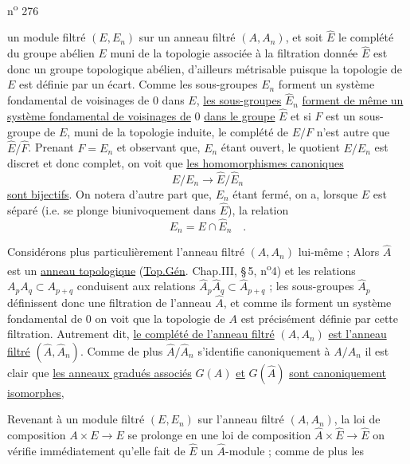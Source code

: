 n\textsuperscript{o} 276

un module filtré $(E,E_n)$ sur un anneau filtré $(A,A_n)$, et soit $\hat E$ le complété du groupe abélien $E$ muni de la topologie associée à la filtration donnée $\hat E$ est donc un groupe topologique abélien, d'ailleurs métrisable puisque la topologie de $E$ est définie par un écart. Comme les sous-groupes $E_n$ forment un système fondamental de voisinages de $0$ dans $E$, \uline{les sous-groupes} $\hat E_n$ \uline{forment de même un système fondamental de voisinages de} $0$ \uline{dans le groupe} $\hat E$ et si $F$ est un sous-groupe de $E$, muni de la topologie induite, le complété de $E/F$ n'est autre que $\hat E/\hat F$. Prenant $F=E_n$ et observant que, $E_n$ étant ouvert, le quotient $E/E_n$ est discret et donc complet, on voit que \uline{les homomorphismes canoniques}
\[
E/E_n\longrightarrow\hat E/\hat E_n
\]
\uline{sont bijectifs}. On notera d'autre part que, $E_n$ étant fermé, on a, lorsque $E$ est séparé (i.e. se plonge biunivoquement dans $\hat E$), la relation
\[
E_n=E\cap\hat E_n\quad.
\]

Considérons plus particulièrement l'anneau filtré $(A,A_n)$ lui-même ; Alors $\hat A$ est un \uline{anneau topologique} (\uline{Top.Gén}. Chap.III, \S\,5, n\textsuperscript{o}4) et les relations $A_p A_q\subset A_{p+q}$ conduisent aux relations $\hat A_p\hat A_q\subset\hat A_{p+q}$ ; les sous-groupes $\hat A_p$ définissent donc une filtration de l'anneau $\hat A$, et comme ils forment un système fondamental de $0$ on voit que la topologie de $A$ est précisément définie par cette filtration. Autrement dit, \uline{le complété de l'anneau filtré} $(A,A_n)$ \uline{est l'anneau filtré} $(\hat A,\hat A_n)$. Comme de plus $\hat A/\hat A_n$ s'identifie canoniquement à $A/A_n$ il est clair que \uline{les anneaux gradués associés} $G(A)$ \uline{et} $G(\hat A)$ \uline{sont canoniquement isomorphes},

Revenant à un module filtré $(E,E_n)$ sur l'anneau filtré $(A,A_n)$, la loi de composition $A\times E\longrightarrow E$ se prolonge en une loi de composition $\hat A\times\hat E\longrightarrow\hat E$ on vérifie immédiatement qu'elle fait de $\hat E$ un $\hat A$-module ; comme de plus les
